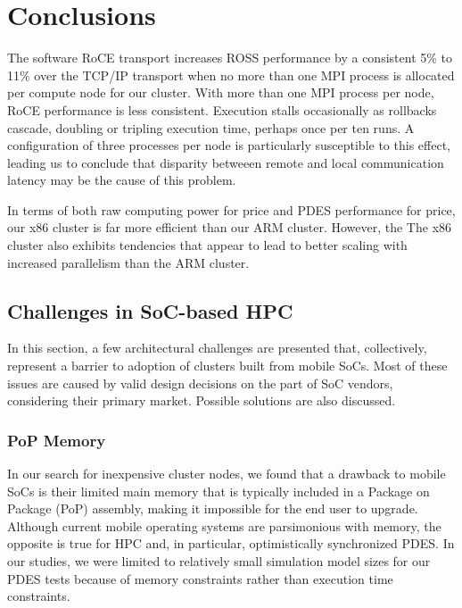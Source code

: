 \documentclass[11pt]{book}
\begin{document}
\chapter{Conclusions}\label{conclusions}

The software RoCE transport increases ROSS performance by a consistent 5\% to
11\% over the TCP/IP transport when no more than one MPI process is allocated
per compute node for our cluster. With more than one MPI process per node, RoCE
performance is less consistent. Execution stalls occasionally as rollbacks
cascade, doubling or tripling execution time, perhaps once per ten runs. A
configuration of three processes per node is particularly susceptible to this
effect, leading us to conclude that disparity betweeen remote and local
communication latency may be the cause of this problem.

In terms of both raw computing power for price and PDES performance for price,
our x86 cluster is far more efficient than our ARM cluster. However, the The x86 cluster also
exhibits tendencies that appear to lead to better scaling with increased
parallelism than the ARM cluster.

\section{Challenges in SoC-based HPC}

In this section, a few architectural challenges are presented that,
collectively, represent a barrier to adoption of clusters built from mobile
SoCs. Most of these issues are caused by valid design decisions on the part of
SoC vendors, considering their primary market. Possible solutions are also
discussed.

\subsection{PoP Memory}

In our search for inexpensive cluster nodes, we found that a drawback to mobile
SoCs is their limited main memory that is typically included in a Package on
Package (PoP) assembly, making it impossible for the end user to
upgrade. Although current mobile operating systems are parsimonious with memory,
the opposite is true for HPC and, in particular, optimistically synchronized
PDES. In our studies, we were limited to relatively small simulation model sizes
for our PDES tests because of memory constraints rather than execution time
constraints.
\end{document}
